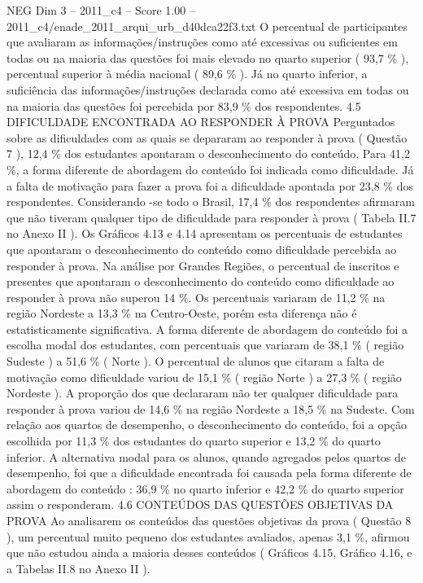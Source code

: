 \begin{textsample}{NEG Dim 3 – 2011\_c4 – Score 1.00 – 2011\_c4/enade\_2011\_arqui\_urb\_d40dca22f3.txt}
O percentual de participantes que avaliaram as informações/instruções como até excessivas ou suficientes em todas ou na maioria das questões foi mais elevado no quarto superior ( 93,7 \% ), percentual superior à média nacional ( 89,6 \% ).
Já no quarto inferior, a suficiência das informações/instruções declarada como até excessiva em todas ou na maioria das questões foi percebida por 83,9 \% dos respondentes. 4.5 DIFICULDADE ENCONTRADA AO RESPONDER À PROVA Perguntados sobre as dificuldades com as quais se depararam ao responder à prova ( Questão 7 ), 12,4 \% dos estudantes apontaram o desconhecimento do conteúdo.
Para 41,2 \%, a forma diferente de abordagem do conteúdo foi indicada como dificuldade.
Já a falta de motivação para fazer a prova foi a dificuldade apontada por 23,8 \% dos respondentes.
Considerando -se todo o Brasil, 17,4 \% dos respondentes afirmaram que não tiveram qualquer tipo de dificuldade para responder à prova ( Tabela II.7 no Anexo II ).
Os Gráficos 4.13 e 4.14 apresentam os percentuais de estudantes que apontaram o desconhecimento do conteúdo como dificuldade percebida ao responder à prova.
Na análise por Grandes Regiões, o percentual de inscritos e presentes que apontaram o desconhecimento do conteúdo como dificuldade ao responder à prova não superou 14 \%.
Os percentuais variaram de 11,2 \% na região Nordeste a 13,3 \% na Centro-Oeste, porém esta diferença não é estatisticamente significativa.
A forma diferente de abordagem do conteúdo foi a escolha modal dos estudantes, com percentuais que variaram de 38,1 \% ( região Sudeste ) a 51,6 \% ( Norte ).
O percentual de alunos que citaram a falta de motivação como dificuldade variou de 15,1 \% ( região Norte ) a 27,3 \% ( região Nordeste ).
A proporção dos que declararam não ter qualquer dificuldade para responder à prova variou de 14,6 \% na região Nordeste a 18,5 \% na Sudeste.
Com relação aos quartos de desempenho, o desconhecimento do conteúdo, foi a opção escolhida por 11,3 \% dos estudantes do quarto superior e 13,2 \% do quarto inferior.
A alternativa modal para os alunos, quando agregados pelos quartos de desempenho, foi que a dificuldade encontrada foi causada pela forma diferente de abordagem do conteúdo : 36,9 \% no quarto inferior e 42,2 \% do quarto superior assim o responderam. 4.6 CONTEÚDOS DAS QUESTÕES OBJETIVAS DA PROVA Ao analisarem os conteúdos das questões objetivas da prova ( Questão 8 ), um percentual muito pequeno dos estudantes avaliados, apenas 3,1 \%, afirmou que não estudou ainda a maioria desses conteúdos ( Gráficos 4.15, Gráfico 4.16, e a Tabelas II.8 no Anexo II ).

\end{textsample}

